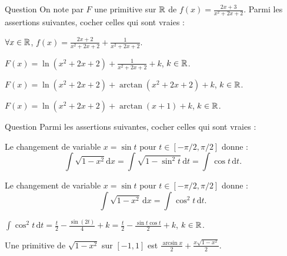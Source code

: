 \begin{multi}[multiple,feedback=
{L'égalité \(2x+3=(2x+2)+1\) donne : \(\displaystyle f(x)=\frac{2x+2}{x^2+2x+2}+\frac{1}{1+(x+1)^2}\). Donc, par linéarité : \(F(x)=\ln (x^2+2x+2)+\arctan (x+1)+k\) pour un \(k\in \Rr\).
}]{Question}
On note par \(F\) une primitive sur \(\mathbb{R}\) de \(\displaystyle f(x)=\frac{2x+3}{x^2+2x+2}\). Parmi les assertions suivantes, cocher celles qui sont vraies :

    \item* \(\forall x\in \mathbb{R}\), \(\displaystyle f(x)=\frac{2x+2}{x^2+2x+2}+\frac{1}{x^2+2x+2}\).
    \item \(\displaystyle F(x)=\ln (x^2+2x+2)+\frac{1}{x^2+2x+2}+k\), \(k\in \Rr\).
    \item \(\displaystyle F(x)=\ln (x^2+2x+2)+\arctan(x^2+2x+2)+k\), \(k\in \Rr\).
    \item* \(\displaystyle F(x)=\ln (x^2+2x+2)+\arctan (x+1)+k\), \(k\in \Rr\).
\end{multi}


\begin{multi}[multiple,feedback=
{Avec \(x=\sin t\), on a : \(\mathrm{d}x=\cos t\, \mathrm{d}t\) et \(\sqrt{1-x^2}=\cos t\) car \(t\in [-\pi/2,\pi/2]\). D'où
\[\int \sqrt{1-x^2}\, \mathrm{d}x=\int \cos ^2t\, \mathrm{d}t=\int \left(\frac{1}{2}+\frac{\cos (2t)}{2}\right)\mathrm{d}t=\frac{t}{2}+\frac{\sin (2t)}{4}+k,\; k\in \Rr.\]
Ainsi
\[\int \sqrt{1-x^2}\, \mathrm{d}x=\frac{t}{2}+\frac{\sin t\cos t}{2}+k=\frac{\arcsin x}{2}+\frac{x\sqrt{1-x^2}}{2}+k,\; k\in \Rr.\]
}]{Question}
Parmi les assertions suivantes, cocher celles qui sont vraies :

    \item Le changement de variable \(x=\sin t\) pour \(t\in [-\pi/2,\pi/2]\) donne :
\[\int \sqrt{1-x^2}\mathrm{d}x=\int \sqrt{1-\sin ^2t}\, \mathrm{d}t=\int \cos t\, \mathrm{d}t.\]
    \item* Le changement de variable \(x=\sin t\) pour \(t\in [-\pi/2,\pi/2]\) donne :
\[\int \sqrt{1-x^2}\, \mathrm{d}x=\int \cos ^2t\, \mathrm{d}t.\]
    \item \(\displaystyle \int \cos ^2t\, \mathrm{d}t=\frac{t}{2}-\frac{\sin (2t)}{4}+k=\frac{t}{2}-\frac{\sin t\cos t}{2}+k\), \(k\in\Rr\).
    \item* Une primitive de \(\displaystyle \sqrt{1-x^2}\) sur \([-1,1]\) est \(\displaystyle \frac{\arcsin x}{2}+\frac{x\sqrt{1-x^2}}{2}\).
\end{multi}


